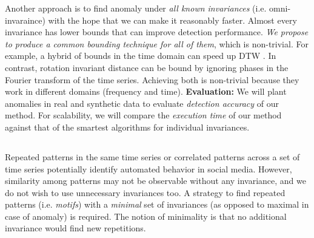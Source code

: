 Another approach is to find anomaly under {\it all known invariances} (i.e. omni-invaraince) with the hope that we can make it reasonably faster. Almost every invariance has lower bounds that can improve detection performance. {\it We propose to produce a common bounding technique for all of them}, which is non-trivial. For example, a hybrid of bounds in the time domain can speed up DTW \cite{Rakthanmanon2012}. In contrast, rotation invariant distance can be bound by ignoring phases in the Fourier transform of the time series. Achieving both is non-trivial because they work in different domains (frequency and time). 
\textbf{Evaluation:} We will plant anomalies in real and synthetic data to evaluate {\it detection accuracy} of our method. For scalability, we will compare the {\it execution time} of our method against that of the smartest algorithms for individual invariances.


\subsection{\Tthreethree}




Repeated patterns in the same time series or correlated patterns across a set of time series potentially identify automated behavior in social media. However, similarity among patterns may not be observable without any invariance, and we do not wish to use unnecessary invariances too. A strategy to find repeated patterns (i.e. {\it motifs}) with a {\it minimal} set of invariances (as opposed to maximal in case of anomaly) is required. The notion of minimality is that no additional invariance would find new repetitions.

